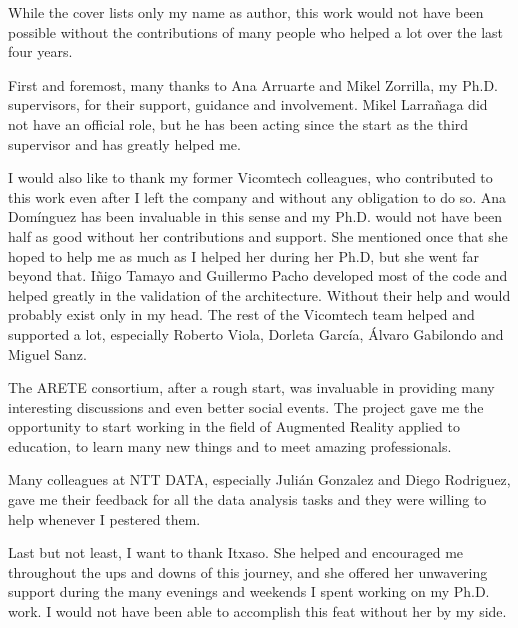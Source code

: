 


\begin{acknowledgementslong} 

While the cover lists only my name as author, this work would not have been possible without the contributions of many people who helped a lot over the last four years.

First and foremost, many thanks to Ana Arruarte and Mikel Zorrilla, my Ph.D. supervisors, for their support, guidance and involvement. Mikel Larrañaga did not have an official role, but he has been acting since the start as the third supervisor and has greatly helped me.

I would also like to thank my former Vicomtech colleagues, who contributed to this work even after I left the company and without any obligation to do so. Ana Domínguez has been invaluable in this sense and my Ph.D. would not have been half as good without her contributions and support. She mentioned once that she hoped to help me as much as I helped her during her Ph.D, but she went far beyond that. Iñigo Tamayo and Guillermo Pacho developed most of the code and helped greatly in the validation of the architecture. Without their help \arch{} and \appname{} would probably exist only in my head. The rest of the Vicomtech team helped and supported a lot, especially Roberto Viola, Dorleta García, Álvaro Gabilondo and Miguel Sanz. 

The ARETE consortium, after a rough start, was invaluable in providing many interesting discussions and even better social events. The project gave me the opportunity to start working in the field of Augmented Reality applied to education, to learn many new things and to meet amazing professionals.

Many colleagues at NTT DATA, especially Julián Gonzalez and Diego Rodriguez, gave me their feedback for all the data analysis tasks and they were willing to help whenever I pestered them.

Last but not least, I want to thank Itxaso. She helped and encouraged me throughout the ups and downs of this journey, and she offered her unwavering support during the many evenings and weekends I spent working on my Ph.D. work. I would not have been able to accomplish this feat without her by my side.


\end{acknowledgementslong}
